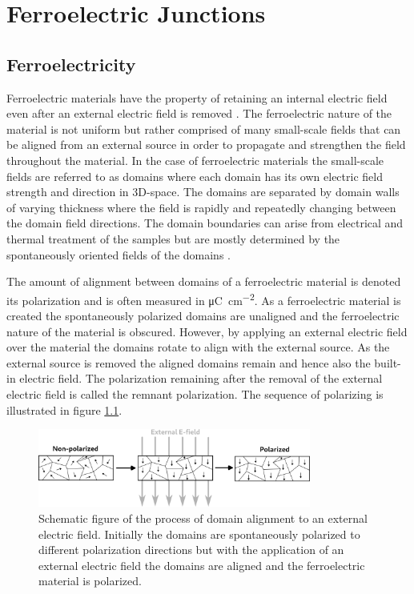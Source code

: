 \documentclass[11pt,twoside]{eitExjobb}
\begin{document}
\cite{oconnor2018stabilization}
    
\chapter{Ferroelectric Junctions}\label{ch:ferro}

\section{Ferroelectricity}\label{sec:ferro}

Ferroelectric materials have the property of retaining an internal electric
field even after an external electric field is removed
\cite{dawber2005physics}. The ferroelectric nature of the material is not
uniform but rather comprised of many small-scale fields that can be aligned
from an external source in order to propagate and strengthen the field
throughout the material. In the case of ferroelectric materials the small-scale
fields are referred to as domains where each domain has its own electric field
strength and direction in 3D-space. The domains are separated by domain walls
of varying thickness where the field is rapidly and repeatedly changing between
the domain field directions. The domain boundaries can arise from electrical
and thermal treatment of the samples but are mostly determined by the
spontaneously oriented fields of the domains \cite{damjanovic2006hysteresis}.

The amount of alignment between domains of a ferroelectric material is denoted
its polarization and is often measured in
\si{\micro\coulomb\per\centi\meter\squared}. As a ferroelectric material is
created the spontaneously polarized domains are unaligned and the ferroelectric
nature of the material is obscured. However, by applying an external electric
field over the material the domains rotate to align with the external source.
As the external source is removed the aligned domains remain and hence also the
built-in electric field. The polarization remaining after the removal of the
external electric field is called the remnant polarization. The sequence of
polarizing is illustrated in figure \ref{fig:theo_domain}.

\begin{figure}[htbp]
    \centering
    \includegraphics[width=0.80\textwidth]{fig/img/polarized.png}
    \caption{Schematic figure of the process of domain alignment to an external
    electric field. Initially the domains are spontaneously polarized to
    different polarization directions but with the application of an external
    electric field the domains are aligned and the ferroelectric material is
    polarized.}
    \label{fig:theo_domain}
\end{figure}
\end{document}
